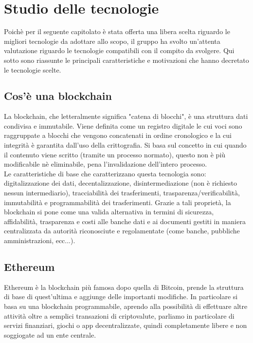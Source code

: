 \section{Studio delle tecnologie}

Poichè per il seguente capitolato è stata offerta una libera scelta riguardo le migliori tecnologie da adottare allo scopo, il gruppo ha svolto un'attenta valutazione
riguardo le tecnologie compatibili con il compito da svolgere.
Qui sotto sono riassunte le principali caratteristiche e motivazioni che hanno decretato le tecnologie scelte.

\subsection{Cos'è una blockchain}
La blockchain, che letteralmente significa "catena di blocchi", è una struttura dati condivisa e
immutabile. Viene definita come un registro digitale le cui voci sono raggruppate a blocchi che
vengono concatenati in ordine cronologico e la cui integrità è garantita dall'uso della crittografia.
Si basa sul concetto in cui quando il contenuto viene scritto (tramite un processo normato), questo non
è più modificabile nè eliminabile, pena l'invalidazione dell'intero processo.\\
Le caratteristiche di base che caratterizzano questa tecnologia sono: digitalizzazione dei dati, decentalizzazione,
disintermediazione (non è richiesto nessun intermediario), tracciabilità dei trasferimenti, trasparenza/verificabilità,
immutabilità e programmabilità dei trasferimenti. Grazie a tali proprietà, la blockchain si pone come una valida
alternativa in termini di sicurezza, affidabilità, trasparenza e costi alle banche dati e ai documenti gestiti in maniera
centralizzata da autorità riconosciute e regolamentate (come banche, pubbliche amministrazioni, ecc...).

\subsection{Ethereum}
Ethereum è la blockchain più famosa dopo quella di Bitcoin, prende la struttura di base di quest'ultima e aggiunge delle
importanti modifiche. In particolare si basa su una blockchain programmabile, aprendo alla possibilità di effettuare altre attività
oltre a semplici transazioni di criptovalute, parliamo in particolare di servizi finanziari, giochi o app decentralizzate, quindi
completamente libere e non soggiogate ad un ente centrale.

